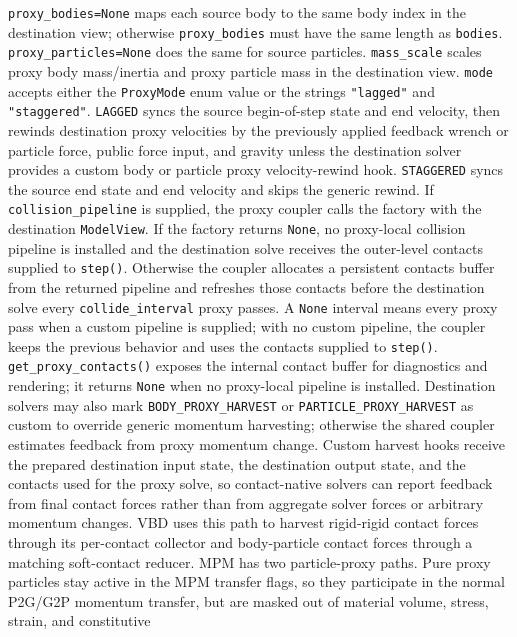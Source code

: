\documentclass[11pt]{article}
\begin{document}
\texttt{proxy\_bodies=None} maps each source body to the same body index in the
destination view; otherwise \texttt{proxy\_bodies} must have the same length as
\texttt{bodies}. \texttt{proxy\_particles=None} does the same for source particles.
\texttt{mass\_scale} scales proxy body mass/inertia and proxy particle mass in the
destination view. \texttt{mode} accepts either the \texttt{ProxyMode} enum value or
the strings \texttt{"lagged"} and \texttt{"staggered"}. \texttt{LAGGED} syncs the
source begin-of-step state and end velocity, then rewinds destination proxy
velocities by the previously applied feedback wrench or particle force, public
force input, and gravity unless the destination solver provides a custom body or
particle proxy velocity-rewind hook.
\texttt{STAGGERED} syncs the source end state and end velocity and skips the
generic rewind. If \texttt{collision\_pipeline} is supplied, the proxy coupler
calls the factory with the destination \texttt{ModelView}. If the factory returns
\texttt{None}, no proxy-local collision pipeline is installed and the destination
solve receives the outer-level contacts supplied to \texttt{step()}. Otherwise
the coupler allocates a persistent contacts buffer from the returned pipeline and
refreshes those contacts before the destination solve every
\texttt{collide\_interval} proxy passes. A \texttt{None} interval means every
proxy pass when a custom pipeline is supplied; with no custom pipeline, the
coupler keeps the previous behavior and uses the contacts supplied to
\texttt{step()}. \texttt{get\_proxy\_contacts()} exposes the internal contact
buffer for diagnostics and rendering; it returns \texttt{None} when no
proxy-local pipeline is installed.
Destination solvers may also mark
\texttt{BODY\_PROXY\_HARVEST} or \texttt{PARTICLE\_PROXY\_HARVEST} as custom to
override generic momentum harvesting; otherwise the shared coupler estimates
feedback from proxy momentum change. Custom harvest hooks receive the prepared
destination input state, the destination output state, and the contacts used for
the proxy solve, so contact-native solvers can report feedback from final contact
forces rather than from aggregate solver forces or arbitrary momentum changes.
VBD uses this path to harvest rigid-rigid contact forces through its per-contact
collector and body-particle contact forces through a matching soft-contact
reducer. MPM has two particle-proxy paths. Pure proxy particles stay active in
the MPM transfer flags, so they participate in the normal P2G/G2P momentum
transfer, but are masked out of material volume, stress, strain, and constitutive
\end{document}
